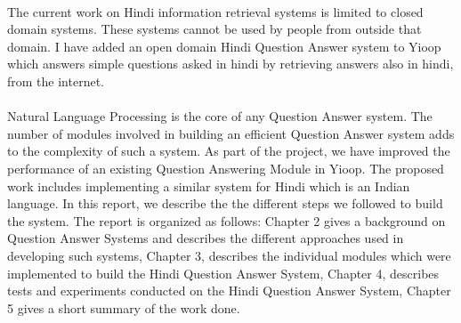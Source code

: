 \paragraph{}
The current work on Hindi information retrieval systems is limited to closed domain systems. These systems cannot be used by people from outside that domain. I have added an open domain Hindi Question Answer system to Yioop which answers simple questions asked in hindi by retrieving answers also in hindi, from the internet. 

\paragraph{}
Natural Language Processing is the core of any Question Answer system. The number of modules involved in building an efficient Question Answer system adds to the complexity of such a system. As part of the project, we have improved the performance of an existing Question Answering Module \cite {patel2015question} in Yioop. The proposed work includes implementing a similar system for Hindi which is an Indian language. In this report, we describe the the different steps we followed to build the system. The report is organized as follows: Chapter 2 gives a background on Question Answer Systems and describes the different approaches used in developing such systems, Chapter 3, describes the individual modules which were implemented to build the Hindi Question Answer System, Chapter 4, describes tests and experiments conducted on the Hindi Question Answer System, Chapter 5 gives a short summary of the work done.

